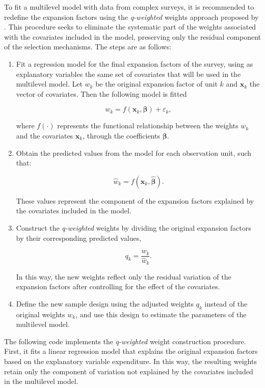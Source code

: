 \documentclass[
  english,
  12pt,
]{book}
\begin{document}
To fit a multilevel model with data from complex surveys, it is recommended to redefine the expansion factors using the \emph{q-weighted} weights approach proposed by \citet{pfeffermann2011modelling}. This procedure seeks to eliminate the systematic part of the weights associated with the covariates included in the model, preserving only the residual component of the selection mechanisms. The steps are as follows:

\begin{enumerate}
\def\labelenumi{\arabic{enumi}.}
\item
  Fit a regression model for the final expansion factors of the survey, using as explanatory variables the same set of covariates that will be used in the multilevel model. Let \(w_k\) be the original expansion factor of unit \(k\) and \(\mathbf{x}_k\) the vector of covariates. Then the following model is fitted

  \[
  w_k = f(\mathbf{x}_k, \boldsymbol{\beta}) + \varepsilon_k,
  \]

  where \(f(\cdot)\) represents the functional relationship between the weights \(w_k\) and the covariates \(\mathbf{x}_k\), through the coefficients \(\boldsymbol{\beta}\).
\item
  Obtain the predicted values from the model for each observation unit, such that:

  \[
  \hat{w}_k = f(\mathbf{x}_k, \hat{\boldsymbol{\beta}}).
  \]

  These values represent the component of the expansion factors explained by the covariates included in the model.
\item
  Construct the \emph{q-weighted} weights by dividing the original expansion factors by their corresponding predicted values,

  \[
  q_k = \frac{w_k}{\hat{w}_k}.
  \]

  In this way, the new weights reflect only the residual variation of the expansion factors after controlling for the effect of the covariates.
\item
  Define the new sample design using the adjusted weights \(q_k\) instead of the original weights \(w_k\), and use this design to estimate the parameters of the multilevel model.
\end{enumerate}

The following code implements the \emph{q-weighted} weight construction procedure. First, it fits a linear regression model that explains the original expansion factors based on the explanatory variable expenditure. In this way, the resulting weights retain only the component of variation not explained by the covariates included in the multilevel model.
\end{document}
